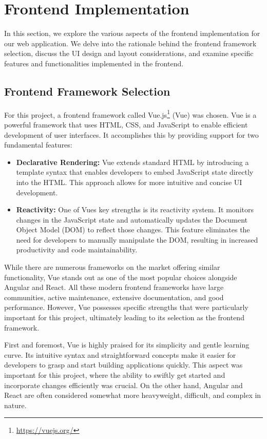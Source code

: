 \documentclass[a4paper,10pt]{report}
\begin{document}
\section{Frontend Implementation}
In this section, we explore the various aspects of the frontend implementation for our web application. We delve into the rationale behind the frontend framework selection, discuss the UI design and layout considerations, and examine specific features and functionalities implemented in the frontend.

\subsection{Frontend Framework Selection}
For this project, a frontend framework called Vue.js\footnote{\url{https://vuejs.org/}} (Vue) was chosen. Vue is a powerful framework that uses HTML, CSS, and JavaScript to enable efficient development of user interfaces. It accomplishes this by providing support for two fundamental features:

\begin{itemize}
  \item \textbf{Declarative Rendering:} Vue extends standard HTML by introducing a template syntax that enables developers to embed JavaScript state directly into the HTML. This approach allows for more intuitive and concise UI development.

  \item \textbf{Reactivity:} One of Vues key strengths is its reactivity system. It monitors changes in the JavaScript state and automatically updates the Document Object Model (DOM) to reflect those changes. This feature eliminates the need for developers to manually manipulate the DOM, resulting in increased productivity and code maintainability. 
\end{itemize} \cite{vuejs}

While there are numerous frameworks on the market offering similar functionality, Vue stands out as one of the most popular choices alongside Angular and React. All these modern frontend frameworks have large communities, active maintenance, extensive documentation, and good performance. However, Vue possesses specific strengths that were particularly important for this project, ultimately leading to its selection as the frontend framework.

First and foremost, Vue is highly praised for its simplicity and gentle learning curve. Its intuitive syntax and straightforward concepts make it easier for developers to grasp and start building applications quickly. This aspect was important for this project, where the ability to swiftly get started and incorporate changes efficiently was crucial. On the other hand, Angular and React are often considered somewhat more heavyweight, difficult, and complex in nature. \cite{KernComparing}
\end{document}
